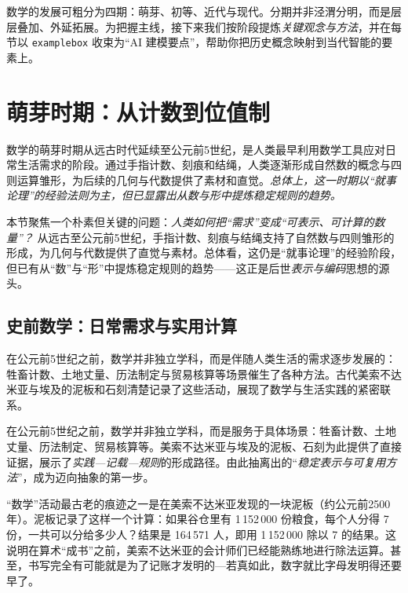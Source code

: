 数学的发展可粗分为四期：萌芽、初等、近代与现代。分期并非泾渭分明，而是层层叠加、外延拓展。为把握主线，接下来我们按阶段提炼\emph{关键观念与方法}，并在每节以 \texttt{examplebox} 收束为“AI 建模要点”，帮助你把历史概念映射到当代智能的要素上。


\section{萌芽时期：从计数到位值制}

数学的萌芽时期从远古时代延续至公元前5世纪，是人类最早利用数学工具应对日常生活需求的阶段。通过手指计数、刻痕和结绳，人类逐渐形成自然数的概念与四则运算雏形，为后续的几何与代数提供了素材和直觉。\emph{总体上，这一时期以“就事论理”的经验法则为主，但已显露出从数与形中提炼稳定规则的趋势。}


本节聚焦一个朴素但关键的问题：\emph{人类如何把“需求”变成“可表示、可计算的数量”？} 从远古至公元前5世纪，手指计数、刻痕与结绳支持了自然数与四则雏形的形成，为几何与代数提供了直觉与素材。总体看，这仍是“就事论理”的经验阶段，但已有从“数”与“形”中提炼稳定规则的趋势——这正是后世\emph{表示与编码}思想的源头。

\subsection{史前数学：日常需求与实用计算}


在公元前5世纪之前，数学并非独立学科，而是伴随人类生活的需求逐步发展的：牲畜计数、土地丈量、历法制定与贸易核算等场景催生了各种方法。古代美索不达米亚与埃及的泥板和石刻清楚记录了这些活动，展现了数学与生活实践的紧密联系。

在公元前5世纪之前，数学并非独立学科，而是服务于具体场景：牲畜计数、土地丈量、历法制定、贸易核算等。美索不达米亚与埃及的泥板、石刻为此提供了直接证据，展示了\emph{实践—记载—规则}的形成路径。由此抽离出的“\emph{稳定表示与可复用方法}”，成为迈向抽象的第一步。

“数学”活动最古老的痕迹之一是在美索不达米亚发现的一块泥板（约公元前2500年）。泥板记录了这样一个计算：如果谷仓里有 1\,152\,000 份粮食，每个人分得 7 份，一共可以分给多少人？结果是 164\,571 人，即用 1\,152\,000 除以 7 的结果。这说明在算术“成书”之前，美索不达米亚的会计师们已经能熟练地进行除法运算。甚至，书写完全有可能就是为了记账才发明的---若真如此，数字就比字母发明得还要早了。


